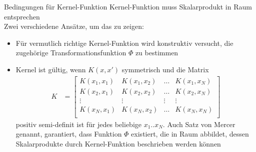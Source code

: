 \documentclass[ngerman]{beamer}
\begin{document}
\begin{frame}{Bedingungen für Kernel-Funktion}
    Kernel-Funktion muss Skalarprodukt in Raum entsprechen \\
    Zwei verschiedene Ansätze, um das zu zeigen: \\ \pause
    \begin{itemize}
        \item Für vermutlich richtige Kernel-Funktion wird konstruktiv versucht, die zugehörige Transformationsfunktion $\Phi$ zu bestimmen \pause
        \item Kernel ist gültig, wenn $K(x, x')$ symmetrisch und die Matrix \[
                                                                                \begin{aligned}
                                                                                    K &=
                                                                                    \begin{bmatrix}
                                                                                        K(x_{1}, x_{1}) & K(x_{1}, x_{2}) & \dots & K(x_{1}, x_{N})\\
                                                                                        K(x_{2}, x_{1}) & K(x_{2}, x_{2}) & \dots & K(x_{2}, x_{N})\\
                                                                                        \vdots & \vdots & \vdots & \vdots\\
                                                                                        K(x_{N}, x_{1}) & K(x_{N}, x_{2}) & \dots & K(x_{N}, x_{N})\\
                                                                                    \end{bmatrix}
                                                                                \end{aligned}
        \] positiv semi-definit ist für jedes beliebige $x_1..x_N$. \pause
        Auch Satz von Mercer genannt, garantiert, dass Funktion $\Phi$ existiert, die in Raum abbildet, dessen Skalarprodukte durch Kernel-Funktion beschrieben werden können
    \end{itemize}
\end{frame}
\end{document}
